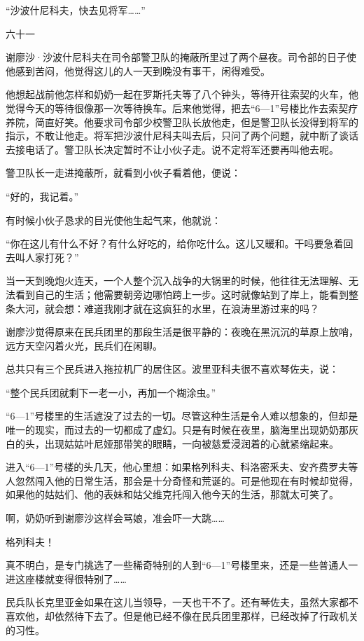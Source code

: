 “沙波什尼科夫，快去见将军……”

六十一

谢廖沙·沙波什尼科夫在司令部警卫队的掩蔽所里过了两个昼夜。司令部的日子使他感到苦闷，他觉得这儿的人一天到晚没有事干，闲得难受。

他想起战前他怎样和奶奶一起在罗斯托夫等了八个钟头，等待开往索契的火车，他觉得今天的等待很像那一次等待换车。后来他觉得，把去“6—1”号楼比作去索契疗养院，简直好笑。他要求司令部少校警卫队长放他走，但是警卫队长没得到将军的指示，不敢让他走。将军把沙波什尼科夫叫去后，只问了两个问题，就中断了谈话去接电话了。警卫队长决定暂时不让小伙子走。说不定将军还要再叫他去呢。

警卫队长一走进掩蔽所，就看到小伙子看着他，便说：

“好的，我记着。”

有时候小伙子恳求的目光使他生起气来，他就说：

“你在这儿有什么不好？有什么好吃的，给你吃什么。这儿又暖和。干吗要急着回去叫人家打死？”

当一天到晚炮火连天，一个人整个沉入战争的大锅里的时候，他往往无法理解、无法看到自己的生活；他需要朝旁边哪怕跨上一步。这时就像站到了岸上，能看到整条大河，就会想：难道我刚才就在这疯狂的水里，在浪涛里游过来的吗？

谢廖沙觉得原来在民兵团里的那段生活是很平静的：夜晚在黑沉沉的草原上放哨，远方天空闪着火光，民兵们在闲聊。

总共只有三个民兵进入拖拉机厂的居住区。波里亚科夫很不喜欢琴佐夫，说：

“整个民兵团就剩下一老一小，再加一个糊涂虫。”

“6—1”号楼里的生活遮没了过去的一切。尽管这种生活是令人难以想象的，但却是唯一的现实，而过去的一切都成了虚幻。只是有时候在夜里，脑海里出现奶奶那灰白的头，出现姑姑叶尼娅那带笑的眼睛，一向被慈爱浸润着的心就紧缩起来。

进入“6—1”号楼的头几天，他心里想：如果格列科夫、科洛密釆夫、安齐费罗夫等人忽然闯入他的日常生活，那会是十分奇怪和荒诞的。可是他现在有时候却觉得，如果他的姑姑们、他的表妹和姑父维克托闯入他今天的生活，那就太可笑了。

啊，奶奶听到谢廖沙这样会骂娘，准会吓一大跳……

格列科夫！

真不明白，是专门挑选了一些稀奇特别的人到“6—1”号楼里来，还是一些普通人一进这座楼就变得很特别了……

民兵队长克里亚金如果在这儿当领导，一天也干不了。还有琴佐夫，虽然大家都不喜欢他，却依然待下去了。但是他已经不像在民兵团里那样，已经改掉了行政机关的习性。

